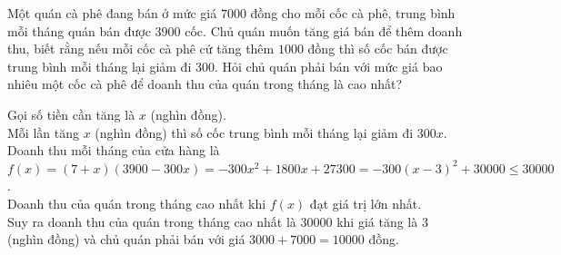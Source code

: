 \begin{bt}%
	Một quán cà phê đang bán ở mức giá $7000$ đồng cho mỗi cốc cà phê, trung bình mỗi tháng quán bán được $3900$ cốc. Chủ quán muốn tăng giá bán để thêm doanh thu, biết rằng nếu mỗi cốc cà phê cứ tăng thêm $1000$ đồng thì số cốc bán được trung bình mỗi tháng lại giảm đi $300$. Hỏi chủ quán phải bán với mức giá bao nhiêu một cốc cà phê để doanh thu của quán trong tháng là cao nhất?
	\loigiai
	{
		Gọi số tiền cần tăng là $x$ (nghìn đồng).\\
		Mỗi lần tăng $x$ (nghìn đồng) thì số cốc trung bình mỗi tháng lại giảm đi $300x$.\\
		Doanh thu mỗi tháng của cửa hàng là\\
		 $f(x)=(7+x)(3900-300x)=-300x^2+1800x+27300=-300(x-3)^2+30000 \le 30000$.\\
		Doanh thu của quán trong tháng cao nhất khi $f(x)$ đạt giá trị lớn nhất.\\
		Suy ra doanh thu của quán trong tháng cao nhất là $30000$ khi giá tăng là $3$ (nghìn đồng) và chủ quán phải bán với giá $3000 + 7000 = 10000$ đồng.
		
}
\end{bt}

